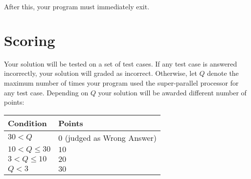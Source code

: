 After this, your program must immediately exit.

\section*{Scoring}
Your solution will be tested on a set of test cases.
If any test case is answered incorrectly, your solution will graded as incorrect.
Otherwise, let $Q$ denote the maximum number of times your program used the super-parallel processor for any test case.
Depending on $Q$ your solution will be awarded different number of points:

\begin{center}
\begin{tabular}{|l|l|}
    \hline
    \textbf{Condition} & \textbf{Points} \\ \hline
    $30 < Q$ & $0$ (judged as Wrong Answer)\\ \hline
    $10 < Q \le 30$ & $10$ \\ \hline
    $3 < Q \le 10$ & $20$ \\ \hline
    $Q < 3$ & $30$ \\ \hline
\end{tabular}
\end{center}
